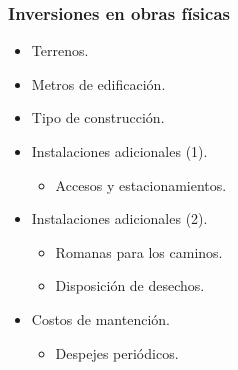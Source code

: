 \documentclass{templateNote}
\begin{document}
\subsubsection{Inversiones en obras físicas}
\vspace{0.5cm}
\begin{minipage}[H]{0.45\textwidth}
    \begin{itemize}
        \item Terrenos.
        \item Metros de edificación.
        \item Tipo de construcción.
        \item Instalaciones adicionales (1).
        \begin{itemize}
            \item Accesos y estacionamientos.
        \end{itemize}
    \end{itemize}
\end{minipage}
\hfill
\begin{minipage}[H]{0.45\textwidth}
    \begin{itemize}
        \item Instalaciones adicionales (2).
        \begin{itemize}
            \item Romanas para los caminos.
            \item Disposición de desechos.
        \end{itemize}
        \item Costos de mantención.
        \begin{itemize}
            \item Despejes periódicos.
        \end{itemize}
    \end{itemize}
\end{minipage}
\end{document}
